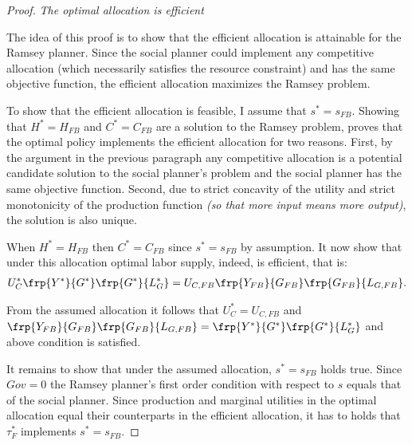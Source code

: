 \begin{proof}\textit{The optimal allocation is efficient}
	
	The idea of this proof is to show that the efficient allocation is attainable for the Ramsey planner. Since the social planner could implement any competitive allocation (which necessarily satisfies the resource constraint) and has the same objective function, the efficient allocation maximizes the Ramsey problem. 
	
	To show that the efficient allocation is feasible, I assume that $s^*=s_{FB}$. Showing that $H^*=H_{FB}$ and $C^*=C_{FB}$ are a solution to the Ramsey problem, proves that the optimal policy implements the efficient allocation for two reasons. First, by the argument in the previous paragraph any competitive allocation is a potential candidate solution to the social planner's problem and the social planner has the same objective function. Second, due to strict concavity of the utility and strict monotonicity of the production function \textit{(so that more input means more output)}, the solution is also unique.
	
	When $H^*=H_{FB}$ then $C^*=C_{FB}$ since $s^*=s_{FB}$ by assumption. It now show that under this allocation optimal labor supply, indeed, is efficient, that is:
	\begin{align}
	U_C^*\frp{Y^*}{G^*}\frp{G^*}{L^*_{G}} = U_{C,FB}\frp{Y_{FB}}{G_{FB}}\frp{G_{FB}}{L_{G,FB}}.
	\end{align}
	
	From the assumed allocation it follows that $U_C^*=U_{C,FB}$ and $\frp{Y_{FB}}{G_{FB}}\frp{G_{FB}}{L_{G,FB}}=\frp{Y^*}{G^*}\frp{G^*}{L^*_{G}}$ and above condition is satisfied. 
	
	It remains to show that under the assumed allocation, $s^*=s_{FB}$ holds true. Since $Gov=0$ the Ramsey planner's first order condition with respect to $s$ equals that of the social planner. Since production and marginal utilities in the optimal allocation equal their counterparts in the efficient allocation, it has to holds that $\tau_F^*$ implements $s^*=s_{FB}$.  
	
\end{proof}

